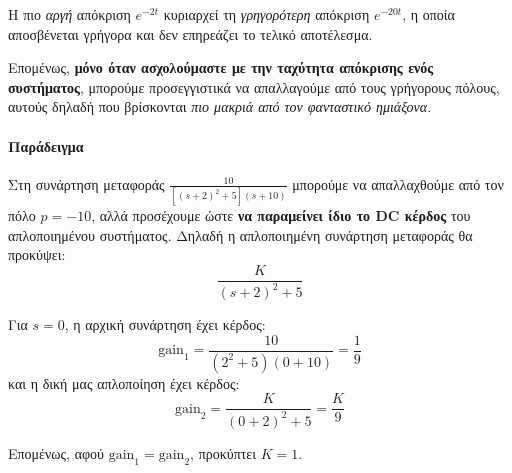 \documentclass[11pt,a4paper,notitlepage,fleqn,final]{article}
\begin{document}

Η πιο \textit{αργή} απόκριση \( e^{-2t} \) κυριαρχεί τη \textit{γρηγορότερη} απόκριση
\( e^{-20t} \), η οποία αποσβένεται γρήγορα και δεν επηρεάζει το τελικό αποτέλεσμα.

Επομένως, \textbf{μόνο όταν ασχολούμαστε με την ταχύτητα απόκρισης ενός συστήματος}, μπορούμε
προσεγγιστικά να απαλλαγούμε από τους γρήγορους πόλους, αυτούς δηλαδή που βρίσκονται
\textit{πιο μακριά από τον φανταστικό ημιάξονα}.

\paragraph{Παράδειγμα}
Στη συνάρτηση μεταφοράς \( \frac{10}{\left[(s+2)^2+5\right](s+10)} \) μπορούμε να
απαλλαχθούμε από τον πόλο \( p=-10 \), αλλά προσέχουμε ώστε \textbf{να παραμείνει ίδιο το
	DC κέρδος} του απλοποιημένου συστήματος. Δηλαδή η απλοποιημένη συνάρτηση μεταφοράς θα
προκύψει:
\[
\frac{K}{(s+2)^2+5}
\]

Για \( s=0 \), η αρχική συνάρτηση έχει κέρδος:
\[
\mathrm{gain}_1 = \frac{10}{(2^2+5)(0+10)} = \frac{1}{9}
\]
και η δική μας απλοποίηση έχει κέρδος:
\[
\mathrm{gain}_2 = \frac{K}{(0+2)^2+5} = \frac{K}{9}
\]

Επομένως, αφού \( \mathrm{gain}_1 = \mathrm{gain}_2 \), προκύπτει \( K = 1\).

\end{document}
